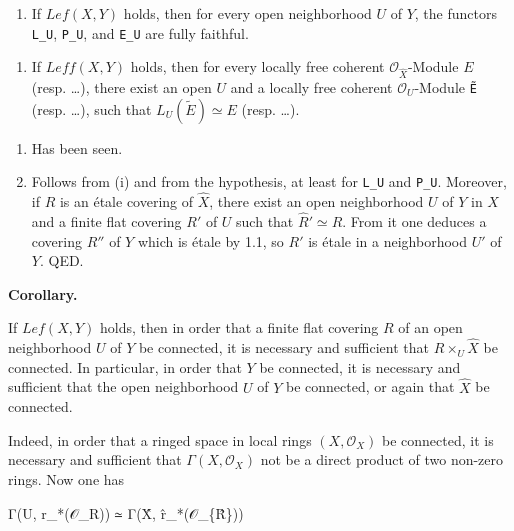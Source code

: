 \documentclass[
]{article}
\newenvironment{Shaded}{}{}
\newcommand{\NormalTok}[1]{#1}
\providecommand{\tightlist}{%
  \setlength{\itemsep}{0pt}\setlength{\parskip}{0pt}}
\begin{document}
\begin{enumerate}
\def\labelenumi{\arabic{enumi}.}
\tightlist
\item
  If \(Lef(X, Y)\) holds, then for every open neighborhood \(U\) of
  \(Y\), the functors \texttt{L\_U}, \texttt{P\_U}, and \texttt{E\_U}
  are fully faithful.
\end{enumerate}

\begin{enumerate}
\def\labelenumi{\arabic{enumi}.}
\tightlist
\item
  If \(Leff(X, Y)\) holds, then for every locally free coherent
  \(\mathcal{O}_{\hat{X}}\)-Module \(E\) (resp. \ldots), there exist an
  open \(U\) and a locally free coherent \(\mathcal{O}_{U}\)-Module
  \texttt{Ẽ} (resp. \ldots), such that \(L_{U}(\tilde{E}) \simeq E\)
  (resp. \ldots).
\end{enumerate}

\begin{enumerate}
\def\labelenumi{(\roman{enumi})}
\item
  Has been seen.
\item
  Follows from (i) and from the hypothesis, at least for \texttt{L\_U}
  and \texttt{P\_U}. Moreover, if \(R\) is an étale covering of
  \(\hat{X}\), there exist an open neighborhood \(U\) of \(Y\) in \(X\)
  and a finite flat covering \(R'\) of \(U\) such that
  \(\hat{R}' \simeq R\). From it one deduces a covering \(R''\) of \(Y\)
  which is étale by 1.1, so \(R'\) is étale in a neighborhood \(U'\) of
  \(Y\). QED.
\end{enumerate}

\textbf{Corollary.}

If \(Lef(X, Y)\) holds, then in order that a finite flat covering \(R\)
of an open neighborhood \(U\) of \(Y\) be connected, it is necessary and
sufficient that \(R \times_{U} \hat{X}\) be connected. In particular, in
order that \(Y\) be connected, it is necessary and sufficient that the
open neighborhood \(U\) of \(Y\) be connected, or again that \(\hat{X}\)
be connected.

Indeed, in order that a ringed space in local rings
\((X, \mathcal{O}_{X})\) be connected, it is necessary and sufficient
that \(\Gamma(X, \mathcal{O}_{X})\) not be a direct product of two
non-zero rings. Now one has

\begin{Shaded}
\begin{Highlighting}[]
\NormalTok{Γ(U, r\_*(𝒪\_R)) ≃ Γ(X̂, r̂\_*(𝒪\_\{R̂\}))}
\end{Highlighting}
\end{Shaded}
\end{document}
